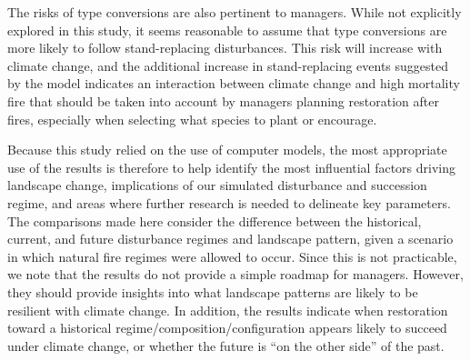 \documentclass[12pt]{article}
\begin{document}
\begin{spacing}{1}
The risks of type conversions are also pertinent to managers. While not explicitly explored in this study, it seems reasonable to assume that type conversions are more likely to follow stand-replacing disturbances. This risk will increase with climate change, and the additional increase in stand-replacing events suggested by the model indicates an interaction between climate change and high mortality fire that should be taken into account by managers planning restoration after fires, especially when selecting what species to plant or encourage.

Because this study relied on the use of computer models, the most appropriate use of the results is therefore to help identify the most influential factors driving landscape change, implications of our simulated disturbance and succession regime, and areas where further research is needed to delineate key parameters. The comparisons made here consider the difference between the historical, current, and future disturbance regimes and landscape pattern, given a scenario in which natural fire regimes were allowed to occur. Since this is not practicable, we note that the results do not provide a simple roadmap for managers. However, they should provide insights into what landscape patterns are likely to be resilient with climate change. In addition, the results indicate when restoration toward a historical regime/composition/configuration appears likely to succeed under climate change, or whether the future is ``on the other side'' of the past. 




\end{spacing}
\end{document}
